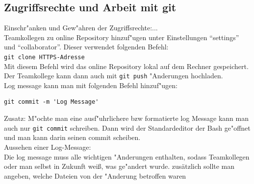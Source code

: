 \documentclass[a4paper,11pt,titlepage]{article}
\begin{document}
\subsection{Zugriffsrechte und Arbeit mit git}
Einschr"anken und Gew"ahren der Zugriffsrechte:...\\
Teamkollegen zu online Repository hinzuf"ugen unter Einstellungen "`settings"' und "`collaborator"'.
Dieser verwendet folgenden Befehl:\\
\verb+git clone HTTPS-Adresse+\\
Mit diesem Befehl wird das online Repository lokal auf dem Rechner gespeichert.
Der Teamkollege kann dann auch mit \verb+git push+ "Anderungen hochladen.
\\
Log message kann man mit folgenden Befehl hinzuf"ugen:
\begin{verbatim}
git commit -m 'Log Message'
\end{verbatim}
Zusatz: M"ochte man eine ausf"uhrlichere bzw formatierte log Message kann man auch nur \verb+git commit+ schreiben. Dann wird der Standardeditor der Bash ge"offnet und man kann darin seinen commit scheiben.\\
Aussehen einer Log-Message:\\
Die log message muss alle wichtigen "Anderungen enthalten, sodass Teamkollegen oder man selbst in Zukunft weiß, was ge"andert wurde. zusätzlich sollte man angeben, welche Dateien von der "Anderung betroffen waren
\end{document}
